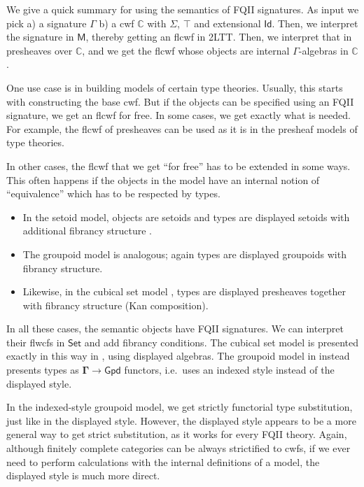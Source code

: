 \documentclass[12pt,a4paper,twoside,openany]{book}
\theoremstyle{remark}
\theoremstyle{definition}
\theoremstyle{theorem}
\newcommand{\ms}[1]{\mathsf{#1}}
\newcommand{\mbb}[1]{\mathbb{#1}}
\newcommand{\bs}[1]{\boldsymbol{#1}}
\newcommand{\Id}{\mathsf{Id}}
\newcommand{\Set}{\mathsf{Set}}
\newcommand{\bM}{\bs{\mathsf{M}}}
\newcommand{\mbbC}{\mbb{C}}
\begin{document}
We give a quick summary for using the semantics of FQII signatures. As input we
pick a) a signature $\Gamma$ b) a cwf $\mbbC$ with $\Sigma$, $\top$ and
extensional $\Id$. Then, we interpret the signature in $\bM$, thereby getting an
flcwf in 2LTT. Then, we interpret that in presheaves over $\mbbC$, and we get
the flcwf whose objects are internal $\Gamma$-algebras in $\mbbC$.

One use case is in building models of certain type theories. Usually, this
starts with constructing the base cwf. But if the objects can be specified using
an FQII signature, we get an flcwf for free. In some cases, we get exactly
what is needed. For example, the flcwf of presheaves can be used as it is in the
presheaf models of type theories.

In other cases, the flcwf that we get ``for free'' has to be extended in some
ways. This often happens if the objects in the model have an internal notion of
``equivalence'' which has to be respected by types.
\begin{itemize}
  \item In the setoid model, objects are setoids and types are displayed
    setoids with additional fibrancy structure \cite{setoidtt}.
  \item The groupoid model \cite{hofmann96groupoidmodel} is analogous; again types are displayed groupoids
    with fibrancy structure.
  \item Likewise, in the cubical set model \cite{cubical}, types are displayed
    presheaves together with fibrancy structure (Kan composition).
\end{itemize}

In all these cases, the semantic objects have FQII signatures. We can interpret
their flwcfs in $\bs{\Set}$ and add fibrancy conditions. The cubical set model
is presented exactly in this way in \cite{cubical}, using displayed
algebras. The groupoid model in \cite{hofmann96groupoidmodel} instead presents
types as $\bs{\Gamma} \to \bs{\ms{Gpd}}$ functors, i.e.\ uses an indexed style
instead of the displayed style.

In the indexed-style groupoid model, we get strictly functorial type
substitution, just like in the displayed style. However, the displayed style
appears to be a more general way to get strict substitution, as it works for
every FQII theory. Again, although finitely complete categories can be always
strictified to cwfs, if we ever need to perform calculations with the
internal definitions of a model, the displayed style is much more direct.
\end{document}

